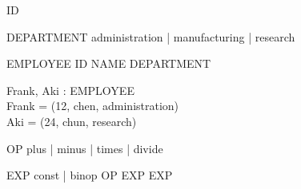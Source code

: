 \documentclass{llncs}
\begin{document}
\begin{zed}
[NAME]
\end{zed}
\begin{zed}
ID  \nat
\end{zed}
\begin{zed}
DEPARTMENT \ddef administration | manufacturing | research
\end{zed}
\begin{zed}
EMPLOYEE  ID \cross NAME \cross DEPARTMENT
\end{zed}
\begin{axdef}
Frank, Aki : EMPLOYEE \\
\ST Frank = (12, chen, administration) \\
Aki = (24, chun, research)
\end{axdef}

\begin{zed}
OP \ddef plus | minus | times | divide
\end{zed}
\begin{zed}
EXP \ddef const \lang \nat \rang | binop \lang OP \cross EXP
\cross EXP \rang
\end{zed}
\end{document}
